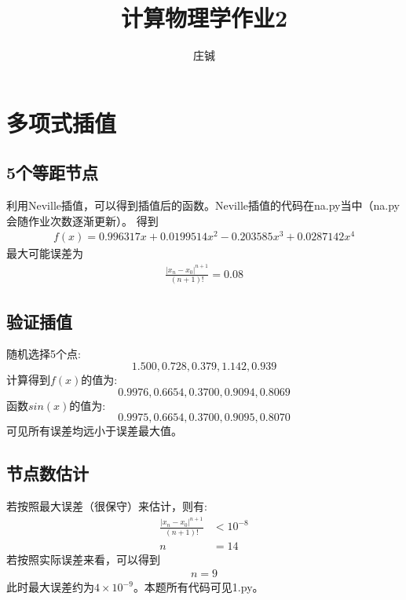 \documentclass{article}
\title{计算物理学作业2}
\author{庄铖}
\numberwithin{equation}{section}
\numberwithin{table}{section}
\begin{document}
\maketitle
\section{多项式插值}
\subsection{5个等距节点}
利用Neville插值，可以得到插值后的函数。Neville插值的代码在na.py当中（na.py会随作业次数逐渐更新）。
得到
\begin{align}
    f\left(x\right)=0.996317 x + 0.0199514 x^2 - 0.203585 x^3 + 0.0287142 x^4
\end{align}
最大可能误差为
\begin{align}
    \frac{\left|x_n-x_0\right|^{n+1}}{\left(n+1\right)!}=0.08
\end{align}
\subsection{验证插值}
随机选择5个点:
$$1.500,0.728,0.379,1.142,0.939$$
计算得到$f\left(x\right)$的值为:
$$0.9976,0.6654,0.3700,0.9094,0.8069$$
函数$sin\left(x\right)$的值为:
$$0.9975,0.6654,0.3700,0.9095,0.8070$$
可见所有误差均远小于误差最大值。
\subsection{节点数估计}
若按照最大误差（很保守）来估计，则有:
\begin{align}
    \frac{\left|x_n-x_0\right|^{n+1}}{\left(n+1\right)!} & <10^{-8} \\
    n                                                    & =14
\end{align}
若按照实际误差来看，可以得到
\begin{align}
    n=9
\end{align}
此时最大误差约为$4\times10^{-9}$。本题所有代码可见1.py。
\end{document}
